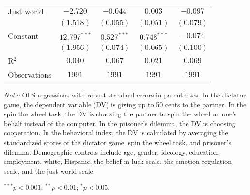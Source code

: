 \begin{table}[!t]
\begin{center}
{\begin{threeparttable}
\begin{tabular}{l c c c c}
Just world                  & $-2.720$       & $-0.044$       & $0.003$       & $-0.097$       \\
                            & $(1.518)$      & $(0.055)$      & $(0.051)$     & $(0.079)$      \\
Constant                    & $12.797^{***}$ & $0.527^{***}$  & $0.748^{***}$ & $-0.074$       \\
                            & $(1.956)$      & $(0.074)$      & $(0.065)$     & $(0.100)$      \\
\midrule
R$^2$                       & $0.040$        & $0.067$        & $0.021$       & $0.069$        \\
Observations                & $1991$         & $1991$         & $1991$        & $1991$         \\
\bottomrule
\end{tabular}
\begin{tablenotes}[flushleft]
\scriptsize{\item[\hspace{-5mm}] \textit{Note:} OLS regressions with robust standard errors in parentheses. 
                                In the dictator game, the dependent variable (DV) is giving up to 50 cents to the partner. 
                                In the spin the wheel task, the DV is choosing the partner to spin the wheel on one’s behalf instead of the computer. 
                                In the prisoner’s dilemma, the DV is choosing cooperation. 
                                In the behavioral index, the DV is calculated by averaging the standardized scores of the dictator game, spin the wheel task, and prisoner's dilemma.
                                Demographic controls include age, gender, ideology,
                                education, employment, white, Hispanic, the belief in luck scale, the emotion regulation scale, and the just world scale. \item[\hspace{-5mm}] $^{***}p<0.001$; $^{**}p<0.01$; $^{*}p<0.05$.}
\end{tablenotes}
\end{threeparttable}
}
\label{tab:behavior_regression_counting_demographic}
\end{center}
\end{table}

\renewcommand{\baselinestretch}{1.67}%
